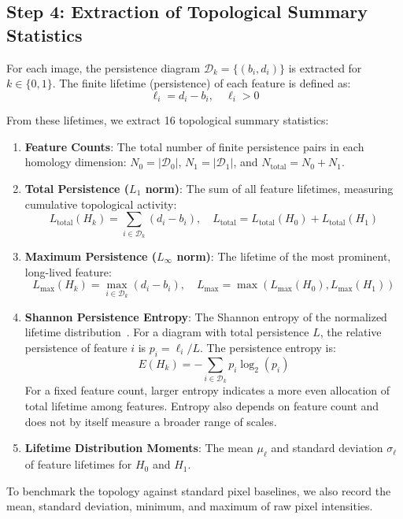 \documentclass[11pt,a4paper]{article}
\begin{document}
\subsection{Step 4: Extraction of Topological Summary Statistics}
For each image, the persistence diagram $\mathcal{D}_k = \{ (b_i, d_i) \}$ is extracted for $k \in \{0, 1\}$. The finite lifetime (persistence) of each feature is defined as:
\begin{equation}
    \ell_i = d_i - b_i, \quad \ell_i > 0
\end{equation}

From these lifetimes, we extract 16 topological summary statistics:
\begin{enumerate}
    \item \textbf{Feature Counts}:
    The total number of finite persistence pairs in each homology dimension: $N_0 = |\mathcal{D}_0|$, $N_1 = |\mathcal{D}_1|$, and $N_{\text{total}} = N_0 + N_1$.
    \item \textbf{Total Persistence ($L_1$ norm)}:
    The sum of all feature lifetimes, measuring cumulative topological activity:
    \begin{equation}
        L_{\text{total}}(H_k) = \sum_{i \in \mathcal{D}_k} (d_i - b_i), \quad L_{\text{total}} = L_{\text{total}}(H_0) + L_{\text{total}}(H_1)
    \end{equation}
    \item \textbf{Maximum Persistence ($L_\infty$ norm)}:
    The lifetime of the most prominent, long-lived feature:
    \begin{equation}
        L_{\max}(H_k) = \max_{i \in \mathcal{D}_k} (d_i - b_i), \quad L_{\max} = \max(L_{\max}(H_0), L_{\max}(H_1))
    \end{equation}
    \item \textbf{Shannon Persistence Entropy}:
    The Shannon entropy of the normalized lifetime distribution~\cite{atienza2019stability}. For a diagram with total persistence $L$, the relative persistence of feature $i$ is $p_i = \ell_i / L$. The persistence entropy is:
    \begin{equation}
        E(H_k) = -\sum_{i \in \mathcal{D}_k} p_i \log_2(p_i)
    \end{equation}
    For a fixed feature count, larger entropy indicates a more even allocation of total lifetime among features. Entropy also depends on feature count and does not by itself measure a broader range of scales.
    \item \textbf{Lifetime Distribution Moments}:
    The mean $\mu_\ell$ and standard deviation $\sigma_\ell$ of feature lifetimes for $H_0$ and $H_1$.
\end{enumerate}
To benchmark the topology against standard pixel baselines, we also record the mean, standard deviation, minimum, and maximum of raw pixel intensities.
\end{document}
